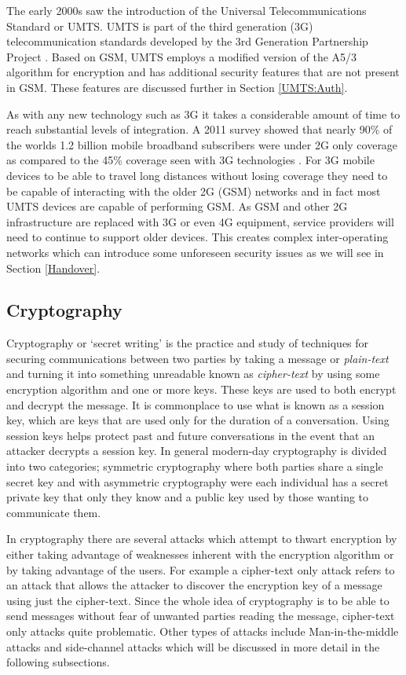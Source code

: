 \documentclass{sig-alternate}
\begin{document}
The early 2000s saw the introduction of the Universal Telecommunications Standard or UMTS. UMTS is part of the third generation (3G) telecommunication standards developed by the 3rd Generation Partnership Project \cite{wiki:UMTS}. Based on GSM, UMTS employs a modified version of the A5/3 algorithm for encryption and has additional security features  that are not present in GSM. These features are discussed further in Section \ref{UMTS:Auth}. 

 As with any new technology such as 3G it takes a considerable amount of time to reach substantial levels of integration. A 2011 survey showed that nearly 90\% of the worlds 1.2 billion mobile broadband subscribers were under 2G only coverage as compared to the 45\% coverage seen with 3G technologies \cite{2G-coverage}. For 3G mobile devices to be able to travel long distances without losing coverage they need to be capable of interacting with the older 2G (GSM) networks and in fact most UMTS devices are capable of performing GSM. As GSM and other 2G infrastructure are replaced with 3G or even 4G equipment, service providers will need to continue to support older devices. This creates complex inter-operating networks which can introduce some unforeseen security issues as we will see in Section \ref{Handover}.

	\subsection{Cryptography \label{crypto}}
	Cryptography or  `secret writing' is the practice and study of techniques for securing communications between two parties by taking a message or \textit{plain-text} and turning it into something  unreadable known as \textit{cipher-text} by using some encryption algorithm and one or more keys. These keys are used to both encrypt and decrypt the message. It is commonplace to use what is known as a session key, which are keys that are used only for the duration of a conversation. Using session keys helps protect past and future conversations in the event that an attacker decrypts a session key. In general modern-day cryptography is divided into two categories; symmetric cryptography where both parties share a single secret key and with asymmetric cryptography were each individual has a secret private key that only they know and a public key used by those wanting to communicate them.
	
	In cryptography there are several attacks which attempt to thwart encryption by either taking advantage of weaknesses inherent with the encryption algorithm or by taking advantage of the users. For example a cipher-text only attack refers to an attack that allows the attacker to discover the encryption key of a message using just the cipher-text. Since the whole idea of cryptography is to be able to send messages without fear of unwanted parties reading the message, cipher-text only attacks quite problematic. Other types of attacks include Man-in-the-middle attacks and side-channel attacks which will be discussed in more detail in the following subsections.   
\end{document}
